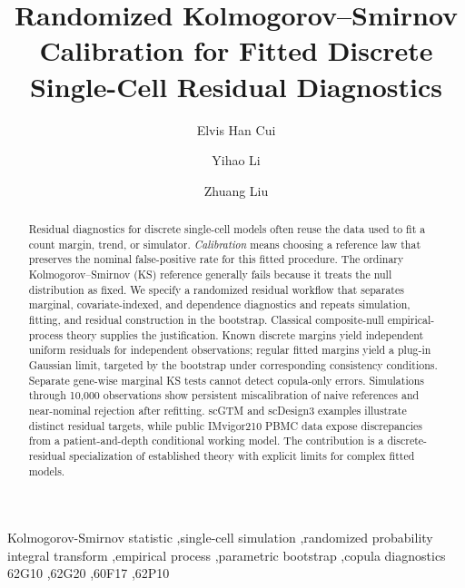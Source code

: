 \documentclass[preprint,12pt]{elsarticle}
\theoremstyle{plain}
\theoremstyle{remark}
\begin{document}
\begin{frontmatter}
\title{Randomized Kolmogorov--Smirnov Calibration for Fitted Discrete Single-Cell Residual Diagnostics}

\author[zju,ucla]{Elvis Han Cui}

\author[zju,genentech]{Yihao Li}

\author[zju,google]{Zhuang Liu}





\begin{abstract}
Residual diagnostics for discrete single-cell models often reuse the data used
to fit a count margin, trend, or simulator. \emph{Calibration} means choosing
a reference law that preserves the nominal false-positive rate for this fitted
procedure. The ordinary Kolmogorov--Smirnov (KS) reference generally fails
because it treats the null distribution as fixed. We specify a randomized
residual workflow that separates marginal, covariate-indexed, and dependence
diagnostics and repeats simulation, fitting, and residual construction in the
bootstrap. Classical composite-null empirical-process theory supplies the
justification. Known discrete margins yield independent uniform residuals for
independent observations; regular fitted margins yield a plug-in Gaussian
limit, targeted by the bootstrap under corresponding consistency conditions.
Separate gene-wise marginal KS tests cannot detect copula-only errors.
Simulations through 10,000 observations show persistent miscalibration of naive
references and near-nominal rejection after refitting. scGTM and scDesign3
examples illustrate distinct residual targets, while public IMvigor210 PBMC
data expose discrepancies from a patient-and-depth conditional working model.
The contribution is a discrete-residual specialization of established theory
with explicit limits for complex fitted models.
\end{abstract}

\begin{keyword}
Kolmogorov-Smirnov statistic \sep single-cell simulation \sep randomized probability integral transform \sep empirical process \sep parametric bootstrap \sep copula diagnostics
\MSC[2020] 62G10 \sep 62G20 \sep 60F17 \sep 62P10
\end{keyword}


\end{frontmatter}
\end{document}
